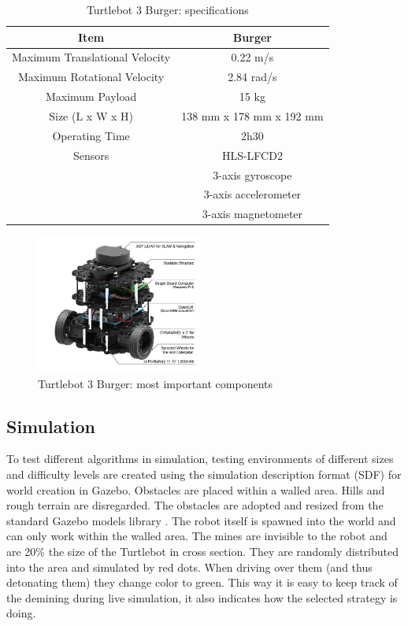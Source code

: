\documentclass[conference]{IEEEtran}
\begin{document}
\begin{table}[htbp]
\caption{Turtlebot 3 Burger: specifications \cite{Robotis2020}}
\begin{center}
\begin{tabular}{|c|c|}
\hline
\textbf{Item}&\textbf{Burger} \\
\hline
Maximum Translational Velocity & 0.22 m/s\\ \hline
Maximum Rotational Velocity & 2.84 rad/s\\ \hline
Maximum Payload & 15 kg\\ \hline
Size (L x W x H) & 138 mm x 178 mm x 192 mm \\ \hline
Operating Time & 2h30 \\ \hline
Sensors & HLS-LFCD2\\ 
& 3-axis gyroscope\\ 
& 3-axis accelerometer\\ 
& 3-axis magnetometer\\ 
\hline
\end{tabular}
\label{tab:TurtlebotSpecs}
\end{center}
\end{table}

\begin{figure}[htbp]
\centerline{\includegraphics[width=55mm]{TB_Components.png}}
\caption{Turtlebot 3 Burger: most important components \cite{Robotis2020}}
\label{fig:TurtlebotComponents}
\end{figure}

\subsection{Simulation}
To test different algorithms in simulation, testing environments of different sizes and difficulty levels are created using the simulation description format (SDF) for world creation in Gazebo. Obstacles are placed within a walled area. Hills and rough terrain are disregarded. The obstacles are adopted and resized from the standard Gazebo models library \cite{GazeboModels2020}. The robot itself is spawned into the world and can only work within the walled area. The mines are invisible to the robot and are 20\% the size of the Turtlebot in cross section. They are randomly distributed into the area and simulated by red dots. When driving over them (and thus detonating them) they change color to green. This way it is easy to keep track of the demining during live simulation, it also indicates how the selected strategy is doing.\\
\end{document}
